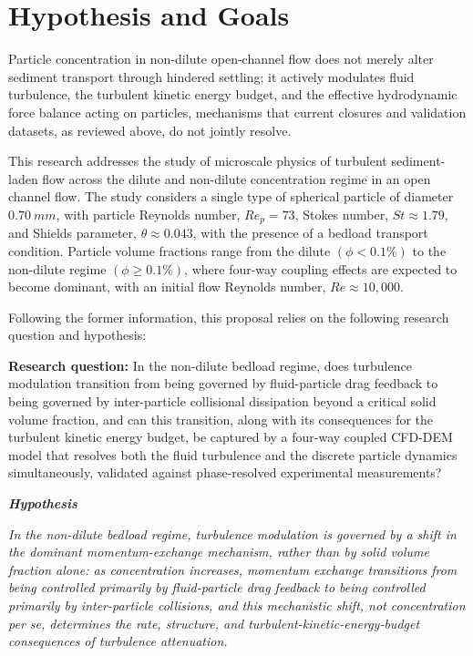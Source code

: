 \hypertarget{hypothesis-and-goals}{%
\section{Hypothesis and Goals}\label{hypothesis-and-goals}}

Particle concentration in non-dilute open-channel flow does not merely alter sediment transport through hindered settling; it actively modulates fluid turbulence, the turbulent kinetic energy budget, and the effective hydrodynamic force balance acting on particles, mechanisms that current closures and validation datasets, as reviewed above, do not jointly resolve.

This research addresses the study of microscale physics of turbulent sediment-laden flow across the dilute and non-dilute concentration regime in an open channel flow. The study considers a single type of spherical particle of diameter \(0.70\ mm\), with particle Reynolds number, \(Re_{p} = 73\), Stokes number, \(St \approx 1.79\), and Shields parameter, \(\theta \approx 0.043\), with the presence of a bedload transport condition. Particle volume fractions range from the dilute \((\phi < 0.1\%)\) to the non-dilute regime \((\phi \geq 0.1\%)\), where four-way coupling effects are expected to become dominant, with an initial flow Reynolds number, \(Re \approx 10,000\).

Following the former information, this proposal relies on the following research question and hypothesis:

\textbf{Research question:} In the non-dilute bedload regime, does turbulence modulation transition from being governed by fluid-particle drag feedback to being governed by inter-particle collisional dissipation beyond a critical solid volume fraction, and can this transition, along with its consequences for the turbulent kinetic energy budget, be captured by a four-way coupled CFD-DEM model that resolves both the fluid turbulence and the discrete particle dynamics simultaneously, validated against phase-resolved experimental measurements?

\emph{\textbf{Hypothesis}}

\emph{In the non-dilute bedload regime, turbulence modulation is governed by a shift in the dominant momentum-exchange mechanism, rather than by solid volume fraction alone: as concentration increases, momentum exchange transitions from being controlled primarily by fluid-particle drag feedback to being controlled primarily by inter-particle collisions, and this mechanistic shift, not concentration per se, determines the rate, structure, and turbulent-kinetic-energy-budget consequences of turbulence attenuation.}

